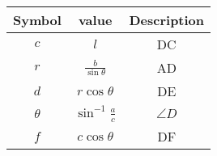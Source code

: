 \begin{tabular}{|c|c|c|}
\hline
Symbol & value & Description\\
\hline
$c$ & $l$ & DC\\
\hline
$r$ & $\frac{b}{\sin{\theta}}$ & AD \\
\hline
$d$ & $r\cos{\theta}$ & DE \\
\hline
$\theta$ & $\sin^{-1}\frac{a}{c}$ & $\angle{D}$ \\
\hline
$f$ & $c\cos{\theta}$ & DF\\
\hline
\end{tabular}
